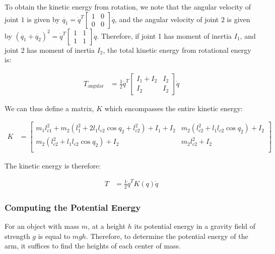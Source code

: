 \documentclass{article}
\begin{document}
To obtain the kinetic energy from rotation, we note that the angular velocity
	of joint $1$ is given by $\dot{q_1} 
	= \dot{q}^T \left[ \begin{matrix} 1 & 0 \\ 0 & 0 \end{matrix} \right] \dot{q}$,
	and the angular velocity of joint $2$ is given by $\left( \dot{q_1} + \dot{q_2} \right)^2
	= \dot{q}^T \left[ \begin{matrix} 1 & 1 \\ 1 & 1 \end{matrix} \right] \dot{q}$.
Therefore, if joint 1 has moment of inertia $I_1$, and joint 2 has moment of inertia
	$I_2$, the total kinetic energy from rotational energy is:

\begin{align}
	T_\text{angular}
	& = \frac 12 \dot{q}^T \left[ \begin{matrix}
	I_1 + I_2 & I_2 \\ I_2 & I_2 \end{matrix} \right] \dot{q} \label{eq-T-angular-from-matrix}
\end{align}

We can thus define a matrix, $K$ which encompasses the entire kinetic energy:

\begin{align}
K & = 
	\left[ \begin{matrix}
	m_1 l_{c1}^2 + m_2 \left( l_1^2 + 2 l_1 l_{c2} \cos q_2 + l_{c2}^2 \right) + I_1 + I_2
		& m_2 \left( l_{c2}^2 + l_1 l_{c2} \cos q_2 \right) + I_2\\
	m_2 \left( l_{c2}^2 + l_1 l_{c2} \cos q_2  \right) + I_2 & m_2 l_{c2}^2 + I_2 \\
	\end{matrix} \right] \label{eq-K}
\end{align}

The kinetic energy is therefore:

\begin{align}
	T & = \frac 12 \dot{q}^T K(q) \dot{q} \label{eq-T-from-K}
\end{align}

\subsubsection{Computing the Potential Energy}

For an object with mass $m$, at a height $h$ its potential energy in a gravity field of strength
	$g$ is equal to $mgh$.
Therefore, to determine the potential energy of the arm, it suffices to find the heights
	of each center of mass.
\end{document}
